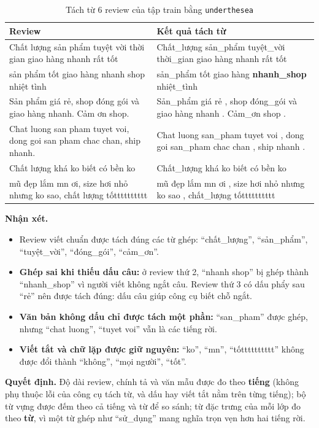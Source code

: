 \begin{table}[H]
\centering
\caption{Tách từ 6 review của tập train bằng \texttt{underthesea}}
\label{tab:text-seg}
\small
\begin{tabular}{>{\raggedright\arraybackslash}p{7.0cm}>{\raggedright\arraybackslash}p{7.4cm}}
\toprule
Review & Kết quả tách từ\\
\midrule
Chất lượng sản phẩm tuyệt vời thời gian giao hàng nhanh rất tốt & Chất\_lượng sản\_phẩm tuyệt\_vời thời\_gian giao hàng nhanh rất tốt\\
sản phẩm tốt giao hàng nhanh shop nhiệt tình & sản\_phẩm tốt giao hàng \textbf{nhanh\_shop} nhiệt\_tình\\
Sản phẩm giá rẻ, shop đóng gói và giao hàng nhanh. Cảm ơn shop. & Sản\_phẩm giá rẻ , shop đóng\_gói và giao hàng nhanh . Cảm\_ơn shop .\\
Chat luong san pham tuyet voi, dong goi san pham chac chan, ship nhanh. & Chat luong san\_pham tuyet voi , dong goi san\_pham chac chan , ship nhanh .\\
Chất lượng khá ko biết có bền ko & Chất\_lượng khá ko biết có bền ko\\
mũ đẹp lắm mn ơi, size hơi nhỏ nhưng ko sao, chất lượng tốtttttttttt & mũ đẹp lắm mn ơi , size hơi nhỏ nhưng ko sao , chất\_lượng tốtttttttttt\\
\bottomrule
\end{tabular}
\end{table}

\textbf{Nhận xét.}
\begin{itemize}[leftmargin=1.5cm]
    \item Review viết chuẩn được tách đúng các từ ghép: ``chất\_lượng'', ``sản\_phẩm'', ``tuyệt\_vời'', ``đóng\_gói'', ``cảm\_ơn''.
    \item \textbf{Ghép sai khi thiếu dấu câu:} ở review thứ 2, ``nhanh shop'' bị ghép thành ``nhanh\_shop'' vì người viết không ngắt câu.
          Review thứ 3 có dấu phẩy sau ``rẻ'' nên được tách đúng: dấu câu giúp công cụ biết chỗ ngắt.
    \item \textbf{Văn bản không dấu chỉ được tách một phần:} ``san\_pham'' được ghép, nhưng ``chat luong'', ``tuyet voi'' vẫn là các tiếng rời.
    \item \textbf{Viết tắt và chữ lặp được giữ nguyên:} ``ko'', ``mn'', ``tốtttttttttt'' không được đổi thành ``không'', ``mọi người'', ``tốt''.
\end{itemize}

\textbf{Quyết định.} Độ dài review, chính tả và văn mẫu được đo theo \textbf{tiếng} (không phụ thuộc lỗi của công cụ tách từ,
và dấu hay viết tắt nằm trên từng tiếng); bộ từ vựng được đếm theo cả tiếng và từ để so sánh; từ đặc trưng của mỗi lớp đo theo
\textbf{từ}, vì một từ ghép như ``sử\_dụng'' mang nghĩa trọn vẹn hơn hai tiếng rời.

